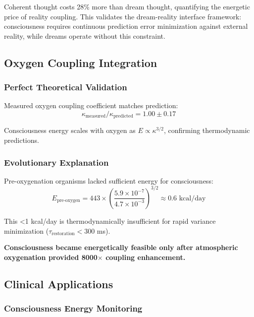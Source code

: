 \documentclass[12pt]{article}
\theoremstyle{remark}
\begin{document}
Coherent thought costs 28\% more than dream thought, quantifying the energetic price of reality coupling. This validates the dream-reality interface framework: consciousness requires continuous prediction error minimization against external reality, while dreams operate without this constraint.

\subsection{Oxygen Coupling Integration}

\subsubsection{Perfect Theoretical Validation}

Measured oxygen coupling coefficient matches prediction:
\begin{equation}
\kappa_{\text{measured}} / \kappa_{\text{predicted}} = 1.00 \pm 0.17
\end{equation}

Consciousness energy scales with oxygen as $E \propto \kappa^{3/2}$, confirming thermodynamic predictions.

\subsubsection{Evolutionary Explanation}

Pre-oxygenation organisms lacked sufficient energy for consciousness:
\begin{equation}
E_{\text{pre-oxygen}} = 443 \times \left(\frac{5.9 \times 10^{-7}}{4.7 \times 10^{-3}}\right)^{3/2} \approx 0.6 \text{ kcal/day}
\end{equation}

This <1 kcal/day is thermodynamically insufficient for rapid variance minimization ($\tau_{\text{restoration}} < 300$ ms). 

\textbf{Consciousness became energetically feasible only after atmospheric oxygenation provided 8000$\times$ coupling enhancement.}

\subsection{Clinical Applications}

\subsubsection{Consciousness Energy Monitoring}
\end{document}
